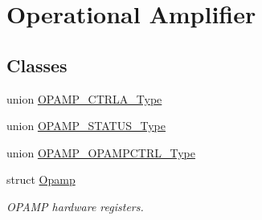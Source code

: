 \hypertarget{group___s_a_m_l21___o_p_a_m_p}{}\section{Operational Amplifier}
\label{group___s_a_m_l21___o_p_a_m_p}
\subsection*{Classes}
\begin{DoxyCompactItemize}
\item 
union \hyperlink{union_o_p_a_m_p___c_t_r_l_a___type}{O\+P\+A\+M\+P\+\_\+\+C\+T\+R\+L\+A\+\_\+\+Type}
\item 
union \hyperlink{union_o_p_a_m_p___s_t_a_t_u_s___type}{O\+P\+A\+M\+P\+\_\+\+S\+T\+A\+T\+U\+S\+\_\+\+Type}
\item 
union \hyperlink{union_o_p_a_m_p___o_p_a_m_p_c_t_r_l___type}{O\+P\+A\+M\+P\+\_\+\+O\+P\+A\+M\+P\+C\+T\+R\+L\+\_\+\+Type}
\item 
struct \hyperlink{struct_opamp}{Opamp}
\begin{DoxyCompactList}\small\item\em O\+P\+A\+M\+P hardware registers. \end{DoxyCompactList}\end{DoxyCompactItemize}
